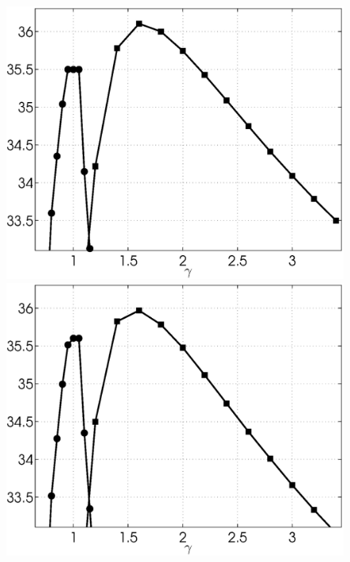 \documentclass{ipol}
\begin{document}
\begin{figure}[ht!]
	\includegraphics[width=.33\textwidth]{f/nldct/WIE1neg-vs-HTH1lin_bpsnr_np2-g-curves_1np040_s10_average.eps}%
	\includegraphics[width=.33\textwidth]{f/nldct/WIE1neg-vs-HTH1lin_bpsnr_np2-g-curves_1np100_s10_average.eps}\\


\end{figure}
\end{document}
